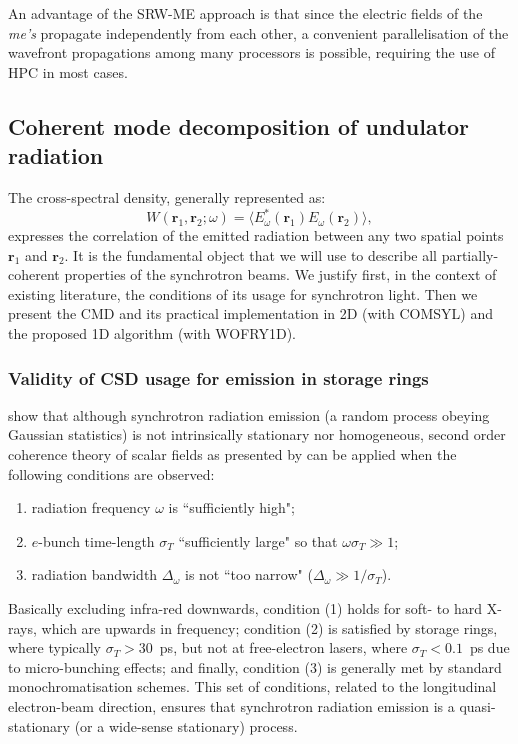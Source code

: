 \documentclass{iucr}              %
\begin{document}
An advantage of the SRW-ME approach is that since the electric fields of the \textit{me's} propagate independently from each other, a convenient parallelisation of the wavefront propagations among many processors is possible, requiring the use of HPC in most cases.
\subsection{Coherent mode decomposition of undulator radiation}\label{sec:CMD}

The cross-spectral density, generally represented as:
\begin{equation}
W(\textbf{r}_1,\textbf{r}_2;\omega) = \big\langle E^*_{\omega}(\textbf{r}_1)  E_{\omega}(\textbf{r}_2)\big\rangle,
\label{eq:CSD_2D}
\end{equation}
expresses the correlation of the emitted radiation between any two spatial points $\textbf{r}_1$ and $\textbf{r}_2$. It is the fundamental object that we will use to describe all partially-coherent properties of the synchrotron beams. We justify first, in the context of existing literature, the conditions of its usage for synchrotron light. Then we present the CMD and its practical implementation in 2D (with COMSYL) and the proposed 1D algorithm (with WOFRY1D).


\subsubsection{Validity of CSD usage for emission in storage rings\\}\label{sec:validity}

 show that although synchrotron radiation emission (a random process obeying Gaussian statistics) is not intrinsically stationary nor homogeneous, second order coherence theory of scalar fields as presented by  can be applied when the following conditions are observed:
\begin{enumerate}%
\item radiation frequency $\omega$ is ``sufficiently high";
\item $e$-bunch time-length $\sigma_{T}$ ``sufficiently large" so that $\omega\sigma_{T}\gg1$;
\item radiation bandwidth $\Delta_\omega$ is not ``too narrow" ($\Delta_\omega\gg1\big/\sigma_{T}$).
\end{enumerate}
Basically excluding infra-red downwards, condition (1) holds for soft- to hard X-rays, which are upwards in frequency; condition (2) is satisfied by storage rings, where typically $\sigma_{T}>30$~ps, but not at free-electron lasers, where $\sigma_{T}<0.1$~ps due to micro-bunching effects; and finally, condition (3) is generally met by standard monochromatisation schemes. This set of conditions, related to the longitudinal electron-beam direction, ensures that synchrotron radiation emission is a quasi-stationary (or a wide-sense stationary) process. 
\end{document}
